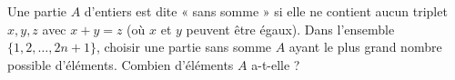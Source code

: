 Une partie $A$ d'entiers est dite « sans somme » si elle ne contient aucun triplet $x, y, z$ avec $x + y = z$ (où $x$ et $y$ peuvent être égaux). Dans l'ensemble $\{1, 2, \ldots, 2n + 1\}$, choisir une partie sans somme $A$ ayant le plus grand nombre possible d'éléments. Combien d'éléments $A$ a-t-elle ?
